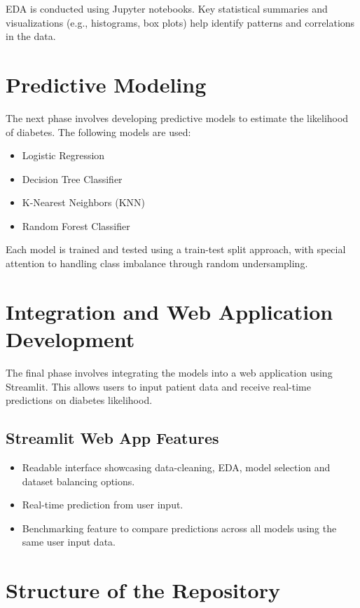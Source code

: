 \documentclass[12pt]{article}
\begin{document}
EDA is conducted using Jupyter notebooks. Key statistical summaries and visualizations (e.g., histograms, box plots) help identify patterns and correlations in the data.

\section{Predictive Modeling}

The next phase involves developing predictive models to estimate the likelihood of diabetes. The following models are used:

\begin{itemize}
    \item Logistic Regression
    \item Decision Tree Classifier
    \item K-Nearest Neighbors (KNN)
    \item Random Forest Classifier
\end{itemize}

Each model is trained and tested using a train-test split approach, with special attention to handling class imbalance through random undersampling.

\section{Integration and Web Application Development}

The final phase involves integrating the models into a web application using Streamlit. This allows users to input patient data and receive real-time predictions on diabetes likelihood.

\subsection{Streamlit Web App Features}

\begin{itemize}
    \item Readable interface showcasing data-cleaning, EDA, model selection and dataset balancing options.
    \item Real-time prediction from user input.
    \item Benchmarking feature to compare predictions across all models using the same user input data.
\end{itemize}

\section{Structure of the Repository}
\end{document}
